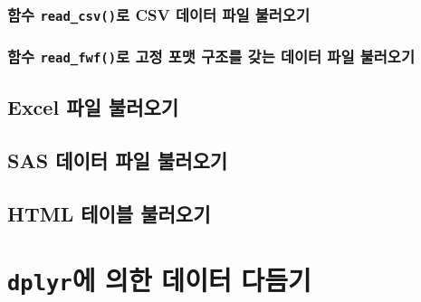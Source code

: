 \documentclass[
]{book}
\begin{document}
\hypertarget{uxd568uxc218-read_csvuxb85c-csv-uxb370uxc774uxd130-uxd30cuxc77c-uxbd88uxb7ecuxc624uxae30}{%
\subsection{\texorpdfstring{함수 \texttt{read\_csv()}로 CSV 데이터 파일 불러오기}{함수 read\_csv()로 CSV 데이터 파일 불러오기}}\label{uxd568uxc218-read_csvuxb85c-csv-uxb370uxc774uxd130-uxd30cuxc77c-uxbd88uxb7ecuxc624uxae30}}

\hypertarget{uxd568uxc218-read_fwfuxb85c-uxace0uxc815-uxd3ecuxb9f7-uxad6cuxc870uxb97c-uxac16uxb294-uxb370uxc774uxd130-uxd30cuxc77c-uxbd88uxb7ecuxc624uxae30}{%
\subsection{\texorpdfstring{함수 \texttt{read\_fwf()}로 고정 포맷 구조를 갖는 데이터 파일 불러오기}{함수 read\_fwf()로 고정 포맷 구조를 갖는 데이터 파일 불러오기}}\label{uxd568uxc218-read_fwfuxb85c-uxace0uxc815-uxd3ecuxb9f7-uxad6cuxc870uxb97c-uxac16uxb294-uxb370uxc774uxd130-uxd30cuxc77c-uxbd88uxb7ecuxc624uxae30}}

\hypertarget{excel-uxd30cuxc77c-uxbd88uxb7ecuxc624uxae30}{%
\section{Excel 파일 불러오기}\label{excel-uxd30cuxc77c-uxbd88uxb7ecuxc624uxae30}}

\hypertarget{sas-uxb370uxc774uxd130-uxd30cuxc77c-uxbd88uxb7ecuxc624uxae30}{%
\section{SAS 데이터 파일 불러오기}\label{sas-uxb370uxc774uxd130-uxd30cuxc77c-uxbd88uxb7ecuxc624uxae30}}

\hypertarget{html-uxd14cuxc774uxbe14-uxbd88uxb7ecuxc624uxae30}{%
\section{HTML 테이블 불러오기}\label{html-uxd14cuxc774uxbe14-uxbd88uxb7ecuxc624uxae30}}

\hypertarget{dplyruxc5d0-uxc758uxd55c-uxb370uxc774uxd130-uxb2e4uxb4ecuxae30}{%
\chapter{\texorpdfstring{\texttt{dplyr}에 의한 데이터 다듬기}{dplyr에 의한 데이터 다듬기}}\label{dplyruxc5d0-uxc758uxd55c-uxb370uxc774uxd130-uxb2e4uxb4ecuxae30}}
\end{document}

